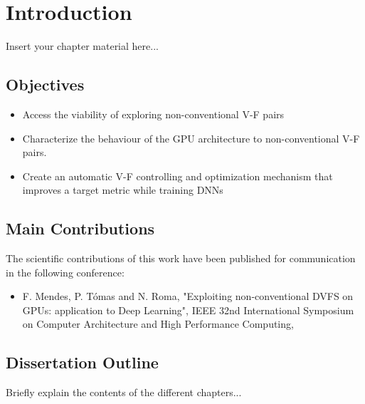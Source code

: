 
\chapter{Introduction}
\label{chapter:introduction}

Insert your chapter material here...




\section{Objectives}
\label{section:objectives}

\begin{itemize}
\item Access the viability of exploring non-conventional V-F pairs
\item Characterize the behaviour of the GPU architecture to non-conventional V-F pairs.
\item Create an automatic V-F controlling and optimization mechanism that improves a target metric while training DNNs
\end{itemize}


\section{Main Contributions}
\label{section:main_contri}

The scientiﬁc contributions of this work have been published for communication in the following conference:

\begin{itemize}
    \item F. Mendes, P. Tómas and N. Roma, "Exploiting non-conventional DVFS on GPUs: application to Deep Learning", IEEE 32nd International Symposium on Computer Architecture and High Performance Computing,
\end{itemize}


\section{Dissertation Outline}
\label{section:outline}

Briefly explain the contents of the different chapters...

